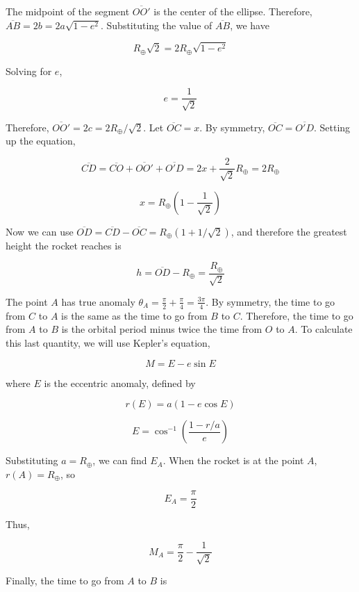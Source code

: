 \documentclass[11pt]{article}
\begin{document}
\begin{pproblem}
\begin{pssolution*}{}{}
\begin{alternativas}
            The midpoint of the segment \(\overline{OO'}\) is the center of the ellipse. Therefore, \(\overline{AB} = 2b = 2a\sqrt{1-e^2}\). Substituting the value of \(\overline{AB}\), we have
            
            \[R_\oplus\sqrt 2 = 2 R_\oplus \sqrt{1-e^2}\]

            Solving for \(e\),

            \[e = \frac{1}{\sqrt{2}}\]

            Therefore, \(\overline{OO'} = 2c = 2R_\oplus/\sqrt2\). Let \(\overline{OC} = x\). By symmetry, \(\overline{OC} = \overline{O'D}\). Setting up the equation,

            \[\overline{CD} = \overline{CO}+\overline{OO'}+\overline{O'D} = 2x + \frac{2}{\sqrt2}R_\oplus = 2R_\oplus\]

            \[x = R_\oplus\left(1 - \frac{1}{\sqrt2}\right)\]

            Now we can use \(\overline{OD} = \overline{CD} - \overline{OC} = R_\oplus\left(1+1/\sqrt2\right)\), and therefore the greatest height the rocket reaches is

            \[\boxed{h = \overline{OD}-R_\oplus = \frac{R_\oplus}{\sqrt2}}\]

            \item The point \(A\) has true anomaly \(\theta_A = \frac{\pi}{2}+\frac{\pi}{4} = \frac{3\pi}{4}\). By symmetry, the time to go from \(C\) to \(A\) is the same as the time to go from \(B\) to \(C\). Therefore, the time to go from \(A\) to \(B\) is the orbital period minus twice the time from \(O\) to \(A\). To calculate this last quantity, we will use Kepler's equation,
            
            \[M = E - e\sin E\]

            where \(E\) is the eccentric anomaly, defined by

            \[r(E)= a(1-e\cos E)\]

            \[E = \cos^{-1}\left(\frac{1-r/a}{e}\right)\]

            Substituting \(a = R_\oplus\), we can find \(E_A\). When the rocket is at the point \(A\), \(r(A)=R_\oplus\), so

            \[E_A=\frac{\pi}{2}\]

            Thus,

            \[M_A = \frac{\pi}{2}-\frac{1}{\sqrt{2}}\]

            Finally, the time to go from \(A\) to \(B\) is


\end{alternativas}
\end{pssolution*}
\end{pproblem}
\end{document}
